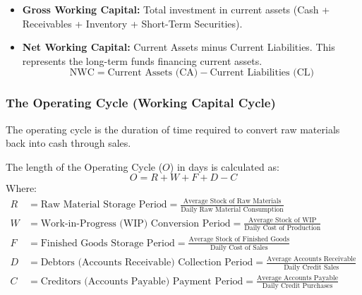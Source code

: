 \documentclass[12pt,a4paper]{article}
\begin{document}
\begin{tcolorbox}[defbox, title={Working Capital Concepts}]
\begin{itemize}[leftmargin=*, itemsep=2.2pt, topsep=0pt]
  \item \textbf{Gross Working Capital:} Total investment in current assets (Cash + Receivables + Inventory + Short-Term Securities).
  \item \textbf{Net Working Capital:} Current Assets minus Current Liabilities. This represents the long-term funds financing current assets.
    \begin{equation}
      \text{NWC} = \text{Current Assets (CA)} - \text{Current Liabilities (CL)}
    \end{equation}
\end{itemize}
\end{tcolorbox}

\subsubsection{The Operating Cycle (Working Capital Cycle)}
The operating cycle is the duration of time required to convert raw materials back into cash through sales.

\begin{tcolorbox}[formulabox, title={Operating Cycle Length Calculation}]
The length of the Operating Cycle ($O$) in days is calculated as:
\begin{equation}
  O = R + W + F + D - C
\end{equation}
Where:
\begin{align*}
  R &= \text{Raw Material Storage Period} = \frac{\text{Average Stock of Raw Materials}}{\text{Daily Raw Material Consumption}} \\
  W &= \text{Work-in-Progress (WIP) Conversion Period} = \frac{\text{Average Stock of WIP}}{\text{Daily Cost of Production}} \\
  F &= \text{Finished Goods Storage Period} = \frac{\text{Average Stock of Finished Goods}}{\text{Daily Cost of Sales}} \\
  D &= \text{Debtors (Accounts Receivable) Collection Period} = \frac{\text{Average Accounts Receivable}}{\text{Daily Credit Sales}} \\
  C &= \text{Creditors (Accounts Payable) Payment Period} = \frac{\text{Average Accounts Payable}}{\text{Daily Credit Purchases}}
\end{align*}
\end{tcolorbox}
\end{document}
